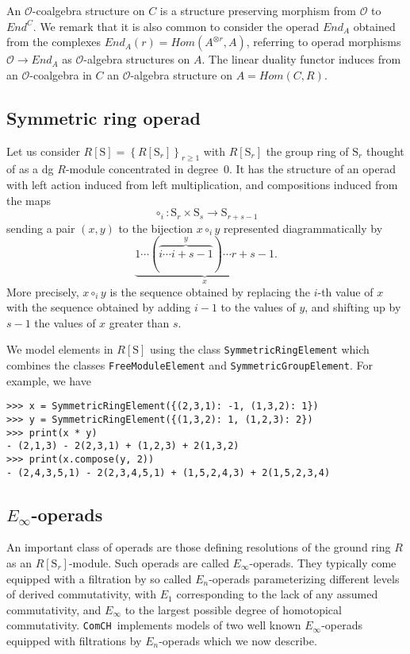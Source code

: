 \documentclass{amsart}
\renewcommand{\S}{\mathrm S}
\newcommand{\comch}{\texttt{ComCH}}
\begin{document}
An $\mathcal O$-coalgebra structure on $C$ is a structure preserving morphism from $\mathcal O$ to $End^C$. We remark that it is also common to consider the operad $End_A$ obtained from the complexes $End_A(r) = Hom(A^{\otimes r}, A)$, referring to operad morphisms $\mathcal O \to End_A$ as $\mathcal O$-algebra structures on $A$. The linear duality functor induces from an $\mathcal O$-coalgebra in $C$ an $\mathcal O$-algebra structure on $A = Hom(C, R)$.

\subsection{Symmetric ring operad}

Let us consider $R[\S] = \left\{R[\S_r]\right\}_{r \geq 1}$ with $R[\S_r]$ the group ring of $\S_r$ thought of as a dg $R$-module concentrated in degree~$0$. It has the structure of an operad with left action induced from left multiplication, and compositions induced from the maps
\begin{equation} \label{eq: compostion of permutations}
\circ_i \colon \S_r \times \S_s \to \S_{r+s-1}
\end{equation}
sending a pair $(x, y)$ to the bijection $x \circ_i y$ represented diagrammatically by
\begin{equation*}
\underbrace{1 \cdots (\overbrace{i \cdots i+s-1}^y) \cdots r+s-1}_x.
\end{equation*}
More precisely, $x \circ_i y$ is the sequence obtained by replacing the $i$-th value of $x$ with the sequence obtained by adding $i-1$ to the values of $y$, and shifting up by $s-1$ the values of $x$ greater than $s$. 

We model elements in $R[\S]$ using the class \texttt{SymmetricRingElement} which combines the classes \texttt{FreeModuleElement} and \texttt{SymmetricGroupElement}. For example, we have
\begin{Verbatim}[frame=single]
>>> x = SymmetricRingElement({(2,3,1): -1, (1,3,2): 1})
>>> y = SymmetricRingElement({(1,3,2): 1, (1,2,3): 2})
>>> print(x * y)
- (2,1,3) - 2(2,3,1) + (1,2,3) + 2(1,3,2)
>>> print(x.compose(y, 2))
- (2,4,3,5,1) - 2(2,3,4,5,1) + (1,5,2,4,3) + 2(1,5,2,3,4)
\end{Verbatim}

\subsection{$E_\infty$-operads}

An important class of operads are those defining resolutions of the ground ring $R$ as an $R[\S_r]$-module. Such operads are called \mbox{$E_\infty$-operads}. They typically come equipped with a filtration by so called $E_n$-operads parameterizing different levels of derived commutativity, with $E_1$ corresponding to the lack of any assumed commutativity, and $E_\infty$ to the largest possible degree of homotopical commutativity. \comch\, implements models of two well known $E_\infty$-operads equipped with filtrations by $E_n$-operads which we now describe.
\end{document}
